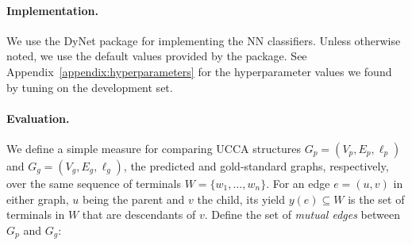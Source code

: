 \documentclass[11pt,a4paper]{article}
\begin{document}
\begin{table}
\caption{Statistics of the \textit{Wiki} and \textit{20K Leagues} UCCA corpora.
All counts exclude the root node, implicit nodes, and linkage nodes and edges.
}
\label{table:data}
\end{table}

\paragraph{Implementation.}
We use the DyNet package \cite{neubig2017dynet} for implementing the NN classifiers.
Unless otherwise noted, we use the default values provided by the package.
See Appendix~\ref{appendix:hyperparameters} for the hyperparameter values we found by tuning
on the development set.

\paragraph{Evaluation.}
We define a simple measure for comparing UCCA structures
$G_p=(V_p,E_p,\ell_p)$ and $G_g=(V_g,E_g,\ell_g)$,
the predicted and gold-standard graphs, respectively, over the same
sequence of terminals $W = \{w_1,\ldots,w_n\}$.
For an edge $e=(u,v)$ in either graph,
$u$ being the parent and $v$ the child, its yield $y(e) \subseteq W$ is the
set of terminals in $W$ that are descendants of $v$.
Define the set of \textit{mutual edges} between $G_p$ and $G_g$:
\end{document}
